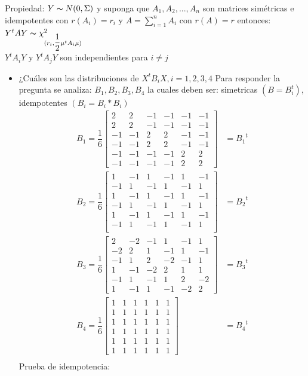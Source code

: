 \documentclass[12pt,a4paper]{report}
\begin{document}
Propiedad: $Y \thicksim N (0, \Sigma)$ y suponga que $A_1, A_2, ..., A_n$ son matrices simétricas e idempotentes con $r(A_i)=r_i$ y $A=\sum_{i=1}^{n}A_{i}$ con $r(A)=r$ entonces: \\
$Y^{t}AY \thicksim \chi^{2}_{(r_{i},\dfrac{1}{2} \mu^{t} A_{i} \mu)}$\\

$Y^{t}A_{i}Y$ y $Y^{t}A_{j}Y$ son independientes para $i\neq j$

\begin{itemize}
 \item[a)]¿Cuáles son las distribuciones de $X^{t}B_{i}X, i=1, 2, 3,4$
 Para responder la pregunta se analiza: $B_1, B_2, B_3, B_4$ la cuales deben ser: simetricas $(B = B^{t} _{i})$, idempotentes $(B_i= {B_i}*{B_i})$\\
 
 \begin{align*}
 B_1 = \dfrac{1}{6}
 \begin{bmatrix}
 2  & 2  & -1 & -1 & -1 & -1\\
  2  & 2  & -1 & -1 & -1 & -1\\
 -1 & -1 & 2  & 2 & -1 & -1\\
 -1 & -1 & 2  & 2 & -1 & -1\\
 -1 & -1 & -1 & -1 & 2  & 2\\
 -1 & -1 & -1 & -1 & 2  & 2 
 \end{bmatrix} &= {B_1}^t \\
B_2=\dfrac{1}{6} \begin{bmatrix}
1 & -1 & 1 & -1 & 1 & -1 \\
-1 & 1 & -1 & 1 & -1 & 1 \\
1 & -1 & 1 & -1 & 1 & -1 \\
-1 & 1 & -1 & 1 & -1 & 1 \\  
1 & -1 & 1 & -1 & 1 & -1 \\
-1 & 1 & -1 & 1 & -1 & 1 \\
 \end{bmatrix} &= {B_2}^t\\ 
B_3 = \dfrac{1}{6} \begin{bmatrix} 
2 & -2 & -1 & 1 & -1 & 1\\
-2 & 2 & 1 & -1 & 1 & -1\\
-1 & 1 & 2 & -2 & -1& 1\\
1 & -1 & -2 & 2 & 1 & 1\\
-1 & 1 & -1 & 1 & 2 & -2\\
1 & -1 & 1 & -1 & -2 & 2
\end{bmatrix} &= {B_3}^t\\ 
B_4 = \dfrac{1}{6} \begin{bmatrix} 
1 & 1 & 1 & 1 & 1 & 1\\
1 & 1 & 1 & 1 & 1 & 1\\
1 & 1 & 1 & 1 & 1 & 1\\
1 & 1 & 1 & 1 & 1 & 1\\
1 & 1 & 1 & 1 & 1 & 1\\
1 & 1 & 1 & 1 & 1 & 1
\end{bmatrix} &= {B_4}^t\\ 
 \end{align*}
Prueba de idempotencia: 


\end{itemize}
\end{document}
